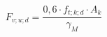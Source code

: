 \documentclass[12pt]{article}
\begin{document}
\begin{displaymath}
F_{v;u;d} = \frac {0,6 \cdot f_{t;k;d} \cdot A_k} {\gamma_M}
\end{displaymath}
\end{document}
